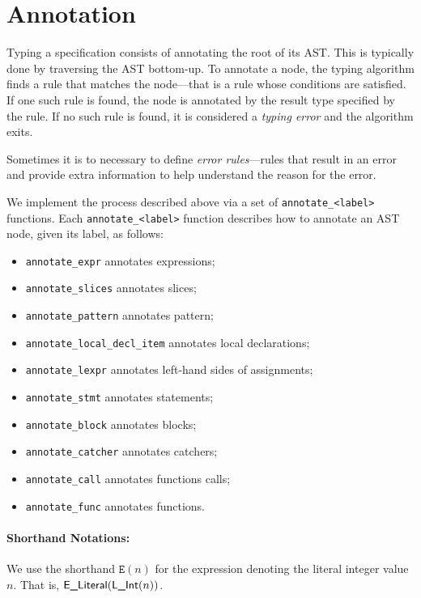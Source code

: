 \documentclass{book}
\begin{document}
\section{Annotation}

Typing a specification consists of annotating the root of its AST. This is typically
done by traversing the AST bottom-up.  To annotate a node, the typing algorithm
finds a rule that matches the node---that is a rule whose conditions are
satisfied. If one such rule is found, the node is annotated by the result type
specified by the rule.  If no such rule is found, it is considered a \emph{typing error}
and the algorithm exits.

Sometimes it is to necessary to define \emph{error rules}---rules that result
in an error and provide extra information to help understand the reason for the
error.

We implement the process described above via a set of
\texttt{annotate\_<label>} functions. Each \texttt{annotate\_<label>}
function describes how to annotate an AST node, given its label, as follows:\begin{itemize}
\item \texttt{annotate\_expr} annotates expressions;
\item \texttt{annotate\_slices} annotates slices;
\item \texttt{annotate\_pattern} annotates pattern;
\item \texttt{annotate\_local\_decl\_item} annotates local declarations;
\item \texttt{annotate\_lexpr} annotates left-hand sides of assignments;
\item \texttt{annotate\_stmt} annotates statements;
\item \texttt{annotate\_block} annotates blocks;
\item \texttt{annotate\_catcher} annotates catchers;
\item \texttt{annotate\_call} annotates functions calls;
\item \texttt{annotate\_func} annotates functions.
\end{itemize}

\paragraph{Shorthand Notations:}
\newcommand\Elit[1]{\texttt{E}(#1)}
We use the shorthand $\Elit{n}$ for the expression denoting the literal integer value $n$. That is, $\textsf{E\_Literal}(\textsf{L\_Int}(n))$.
\end{document}

